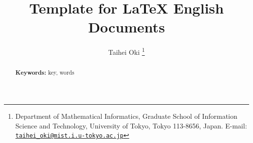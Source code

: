 \documentclass[11pt, a4paper]{article}
\title{Template for LaTeX English Documents}
\author{Taihei Oki%
  \texorpdfstring{\thanks{
    Department of Mathematical Informatics, Graduate School of Information Science and Technology, University of Tokyo, Tokyo 113-8656, Japan.
    E-mail: \href{mailto:taihei_oki@mist.i.u-tokyo.ac.jp}{\nolinkurl{taihei_oki@mist.i.u-tokyo.ac.jp}}
  }}{}
}
\newcommand{\mykeywords}{key, words}
\begin{document}
\maketitle

\begin{abstract}
  

  \bigskip\noindent\textbf{Keywords:} \mykeywords{}
\end{abstract}





\end{document}
